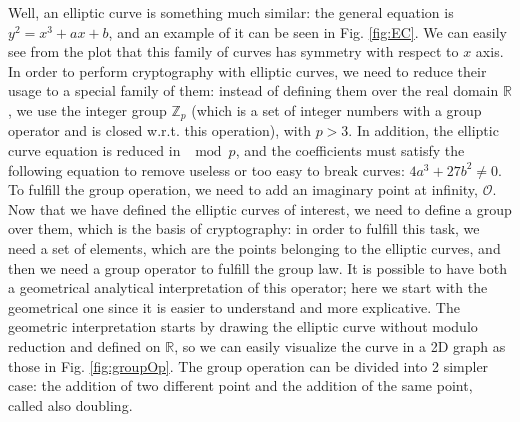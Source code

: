 \documentclass{article}
\begin{document}
 Well, an elliptic curve is something much similar: the general equation is $y^2 = x^3 + ax + b$, and an example of it can be seen in Fig. \ref{fig:EC}. We can easily see from the plot that this family of curves has symmetry with respect to $x$ axis. \newline
 In order to perform cryptography with elliptic curves, we need to reduce their usage to a special family of them: instead of defining them over the real domain $\mathbb{R}$, we use the integer group $\mathbb{Z}_{p}$ (which is a set of integer numbers with a group operator and is closed w.r.t. this operation), with $p > 3$. In addition, the elliptic curve equation is reduced in $\mod p$, and the coefficients must satisfy the following equation to remove useless or too easy to break curves: $4a^3 + 27b^2 \ne{0}$. To fulfill the group operation, we need to add an imaginary point at infinity, $\mathcal{O}$. \newline
 Now that we have defined the elliptic curves of interest, we need to define a group over them, which is the basis of cryptography: in order to fulfill this task, we need a set of elements, which are the points belonging to the elliptic curves, and then we need a group operator to fulfill the group law. It is possible to have both a geometrical analytical interpretation of this operator; here we start with the geometrical one since it is easier to understand and more explicative.\newline
 The geometric interpretation starts by drawing the elliptic curve without modulo reduction and defined on $\mathbb{R}$, so we can easily visualize the curve in a 2D graph as those in Fig. \ref{fig:groupOp}. The group operation can be divided into 2 simpler case: the addition of two different point and the addition of the same point, called also doubling. 
 
\end{document}
